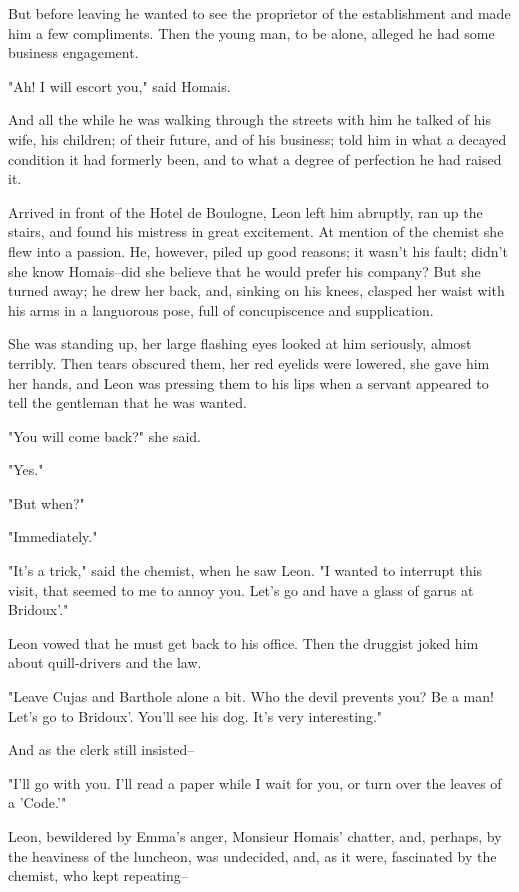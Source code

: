 \documentclass{tufte-book}
\begin{document}
But before leaving he wanted to see the proprietor of the establishment
and made him a few compliments. Then the young man, to be alone, alleged
he had some business engagement.

"Ah! I will escort you," said Homais.

And all the while he was walking through the streets with him he talked
of his wife, his children; of their future, and of his business; told
him in what a decayed condition it had formerly been, and to what a
degree of perfection he had raised it.

Arrived in front of the Hotel de Boulogne, Leon left him abruptly, ran
up the stairs, and found his mistress in great excitement. At mention of
the chemist she flew into a passion. He, however, piled up good reasons;
it wasn't his fault; didn't she know Homais--did she believe that he
would prefer his company? But she turned away; he drew her back, and,
sinking on his knees, clasped her waist with his arms in a languorous
pose, full of concupiscence and supplication.

She was standing up, her large flashing eyes looked at him seriously,
almost terribly. Then tears obscured them, her red eyelids were lowered,
she gave him her hands, and Leon was pressing them to his lips when a
servant appeared to tell the gentleman that he was wanted.

"You will come back?" she said.

"Yes."

"But when?"

"Immediately."

"It's a trick," said the chemist, when he saw Leon. "I wanted to
interrupt this visit, that seemed to me to annoy you. Let's go and have
a glass of garus at Bridoux'."

Leon vowed that he must get back to his office. Then the druggist joked
him about quill-drivers and the law.

"Leave Cujas and Barthole alone a bit. Who the devil prevents you? Be a
man! Let's go to Bridoux'. You'll see his dog. It's very interesting."

And as the clerk still insisted--

"I'll go with you. I'll read a paper while I wait for you, or turn over
the leaves of a 'Code.'"

Leon, bewildered by Emma's anger, Monsieur Homais' chatter, and,
perhaps, by the heaviness of the luncheon, was undecided, and, as it
were, fascinated by the chemist, who kept repeating--
\end{document}
